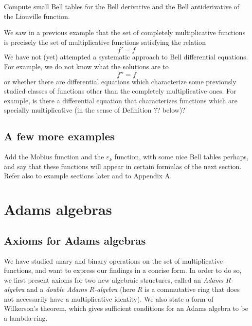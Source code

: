 \documentclass[a4paper]{article}
\begin{document}
\begin{exercise}
Compute small Bell tables for the Bell derivative and the Bell antiderivative of the Liouville function.
\end{exercise}



\begin{remark}
We saw in a previous example that the set of completely multiplicative functions is precisely the set of multiplicative functions satisfying the relation
$$ f' = f $$
We have not (yet) attempted a systematic approach to Bell differential equations. For example, we do not know what the solutions are to 
$$ f'' = f   $$
or whether there are differential equations which characterize some previously studied classes of functions other than the completely multiplicative ones. For example, is there a differential equation that characterizes functions which are specially multiplicative (in the sense of Definition ?? below)?
\end{remark}


\subsection{A few more examples}

Add the Mobius function and the $\varepsilon_k$ function, with some nice Bell tables perhaps, and say that these functions will appear in certain formulas of the next section. Refer also to example sections later and to Appendix A.

\section{Adams algebras}

\subsection{Axioms for Adams algebras}

We have studied unary and binary operations on the set of multiplicative functions, and want to express our findings in a concise form. In order to do so, we first present axioms for two new algebraic structures, called an \emph{Adams $R$-algebra} and a \emph{double Adams $R$-algebra} (here $R$ is a commutative ring that does not necessarily have a multiplicative identity). We also state a form of Wilkerson's theorem, which gives sufficient conditions for an Adams algebra to be a lambda-ring.
\end{document}
